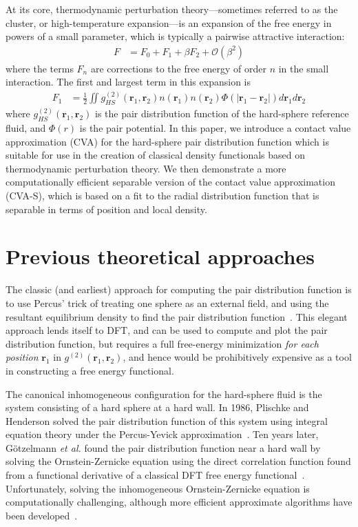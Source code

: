 \documentclass[letterpaper,twocolumn,amsmath,amssymb,pre,aps,10pt]{revtex4-1}
\newcommand{\rr}{\textbf{r}}
\begin{document}
At its core, thermodynamic perturbation theory---sometimes referred to
as the cluster, or high-temperature expansion---is an expansion of the
free energy in powers of a small parameter, which is typically a
pairwise attractive interaction:
\begin{align}
  F &= F_0 + F_1 + \beta F_2 + \mathcal{O}(\beta^2)
\end{align}
where the terms $F_n$ are corrections to the free energy of order $n$
in the small interaction.  The first and largest term in this
expansion is
\begin{align}
  F_1 &= \tfrac12 \iint
  g^{(2)}_{HS}(\rr_1,\rr_2)n(\rr_1)n(\rr_2)\Phi(|\rr_1-\rr_2|)
  d\rr_1d\rr_2
  \label{eq:mean-field}
\end{align}
where $g^{(2)}_{HS}(\rr_1,\rr_2)$ is the pair distribution function of
the hard-sphere reference fluid, and $\Phi(r)$ is the pair potential.
In this paper, we introduce a contact value approximation (CVA) for
the hard-sphere pair distribution function which is suitable for use
in the creation of classical density functionals based on
thermodynamic perturbation theory. We then demonstrate a more
computationally efficient separable version of the contact
value approximation (CVA-S), which is based on a fit to the radial
distribution function that is separable in terms of position and local
density.

\section{Previous theoretical approaches}

The classic (and earliest) approach for computing the pair
distribution function is to use Percus' trick of treating one sphere
as an external field, and using the resultant equilibrium density to
find the pair distribution function~\cite{hansen2006theory}.  This
elegant approach lends itself to DFT, and can be used to compute and
plot the pair distribution function, but requires a full free-energy
minimization \emph{for each position} $\rr_1$ in
$g^{(2)}(\rr_1,\rr_2)$, and hence would be prohibitively expensive as
a tool in constructing a free energy functional.

The canonical inhomogeneous configuration for the hard-sphere fluid is
the system consisting of a hard sphere at a hard wall.  In 1986,
Plischke and Henderson solved the pair distribution function of this
system using integral equation theory under the Percus-Yevick
approximation~\cite{plischke1986pair}.  Ten years later,
G{\"o}tzelmann \emph{et al.} found the pair distribution function near
a hard wall by solving the Ornstein-Zernicke equation using the direct
correlation function found from a functional derivative of a classical
DFT free energy functional~\cite{gotzelmann1996structure}.
Unfortunately, solving the inhomogeneous Ornstein-Zernicke equation is
computationally challenging, although more efficient approximate
algorithms have been developed~\cite{paul2003variational}.
\end{document}
